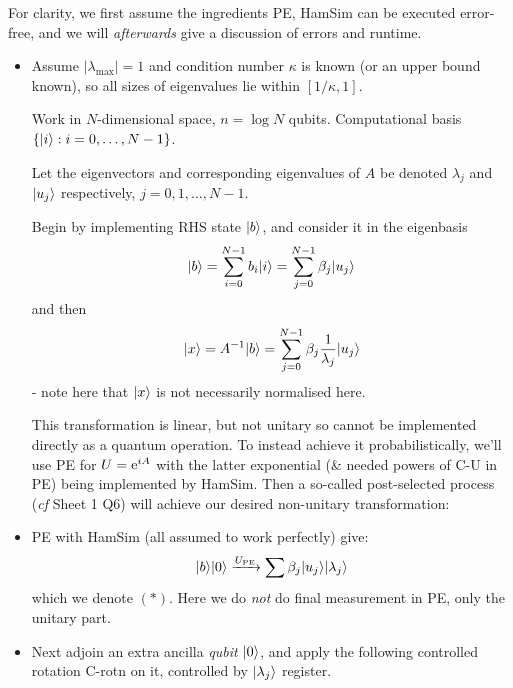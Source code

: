 \documentclass[]{article}
\renewcommand{\it}[1]{\textit{#1}}
\begin{document}
\begin{remark*}
	For clarity, we first assume the ingredients PE, HamSim can be executed error-free, and we will \it{afterwards} give a discussion of errors and runtime.

	\begin{itemize}
		\item Assume $|\lambda_{\max}| = 1$ and condition number $\kappa$ is known (or an upper bound known), so all sizes of eigenvalues lie within $[1/\kappa,1]$.
		
		Work in $N$-dimensional space, $n = \log N$ qubits. Computational basis $\{\lvert i\rangle:i = 0,\dots,N-1\}$.

		Let the eigenvectors and corresponding eigenvalues of $A$ be denoted $\lambda_j$ and $\lvert u_j\rangle$ respectively, $j = 0,1,\dots,N-1$.

		Begin by implementing RHS state $\lvert b\rangle$, and consider it in the eigenbasis $$\lvert b\rangle = \sum_{i=0}^{N-1}b_i\lvert i\rangle = \sum_{j=0}^{N-1}\beta_j\lvert u_j\rangle$$ and then $$\lvert x\rangle = A^{-1}\lvert b\rangle = \sum_{j=0}^{N-1}\beta_j \frac{1}{\lambda_j}\lvert u_j\rangle$$ - note here that $\lvert x\rangle$ is not necessarily normalised here.

		This transformation is linear, but not unitary so cannot be implemented directly as a quantum operation. To instead achieve it probabilistically, we'll use PE for $U = \mathrm{e}^{iA}$ with the latter exponential (\& needed powers of C-U in PE) being implemented by HamSim. Then a so-called post-selected process (\it{cf} Sheet 1 Q6) will achieve our desired non-unitary transformation:

		\item PE with HamSim (all assumed to work perfectly) give:
		\begin{align*}
			\lvert b\rangle\lvert0\rangle\xrightarrow{U_{\textrm{PE}}} \sum \beta_j \lvert u_j\rangle\lvert\lambda_j\rangle
		\end{align*}
		which we denote $(\ast)$. Here we do \it{not} do final measurement in PE, only the unitary part.

		\item Next adjoin an extra ancilla \it{qubit} $\lvert0\rangle$, and apply the following controlled rotation C-rotn on it, controlled by $\lvert\lambda_j\rangle$ register.
		

\end{itemize}
\end{remark*}
\end{document}
